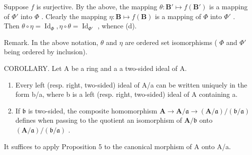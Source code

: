 Suppose \(f\) is surjective. By the above, the mapping \(\theta: \mathbf{B}' \mapsto f(\mathbf{B}')\) is a mapping of \(\Phi'\) into \(\Phi\) . Clearly the mapping \(\eta: \mathbf{B} \mapsto f(\mathbf{B})\) is a mapping of \(\Phi\) into \(\Phi'\) . Then \(\theta \circ \eta = \operatorname{Id}_{\Phi}, \eta \circ \theta = \operatorname{Id}_{\Phi'}\) , whence (d).

Remark. In the above notation, \(\theta\) and \(\eta\) are ordered set isomorphisms ( \(\Phi\) and \(\Phi'\) being ordered by inclusion).

COROLLARY. Let A be a ring and a a two-sided ideal of A.

\begin{enumerate}
\def\labelenumi{(\alph{enumi})}
\item
  Every left (resp. right, two-sided) ideal of A/a can be written uniquely in the form b/a, where b is a left (resp. right, two-sided) ideal of A containing a.
\item
  If \(\mathfrak{b}\) is two-sided, the composite homomorphism \(\mathbf{A} \to \mathbf{A} / \mathfrak{a} \to (\mathbf{A} / \mathfrak{a}) / (\mathfrak{b} / \mathfrak{a})\) defines when passing to the quotient an isomorphism of \(\mathbf{A} / \mathfrak{b}\) onto \((\mathbf{A} / \mathfrak{a}) / (\mathfrak{b} / \mathfrak{a})\) .
\end{enumerate}

It suffices to apply Proposition 5 to the canonical morphism of A onto A/a.

